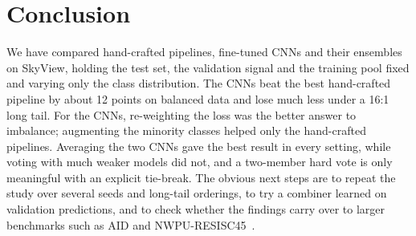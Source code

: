 \section{Conclusion}
\label{sec:conclusion}

We have compared hand-crafted pipelines, fine-tuned CNNs and their ensembles on SkyView, holding the test set, the validation signal and the training pool fixed and varying only the class distribution.
The CNNs beat the best hand-crafted pipeline by about 12 points on balanced data and lose much less under a 16:1 long tail.
For the CNNs, re-weighting the loss was the better answer to imbalance; augmenting the minority classes helped only the hand-crafted pipelines.
Averaging the two CNNs gave the best result in every setting, while voting with much weaker models did not, and a two-member hard vote is only meaningful with an explicit tie-break.
The obvious next steps are to repeat the study over several seeds and long-tail orderings, to try a combiner learned on validation predictions, and to check whether the findings carry over to larger benchmarks such as AID and NWPU-RESISC45~\cite{xia2017aid,cheng2017remote}.
